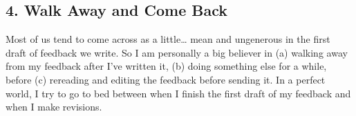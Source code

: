 \documentclass[letterpaper,10pt,english]{jupyterBook}
\begin{document}
\subsection{4. Walk Away and Come Back}
\label{\detokenize{40_in_practice/30_giving_feedback:walk-away-and-come-back}}
\sphinxAtStartPar
Most of us tend to come across as a little… mean and ungenerous in the first draft of feedback we write. So I am personally a big believer in (a) walking away from my feedback after I’ve written it, (b) doing something else for a while, before (c) re\sphinxhyphen{}reading and editing the feedback before sending it. In a perfect world, I try to go to bed between when I finish the first draft of my feedback and when I make revisions.







\renewcommand{\indexname}{Index}
\printindex
\end{document}
